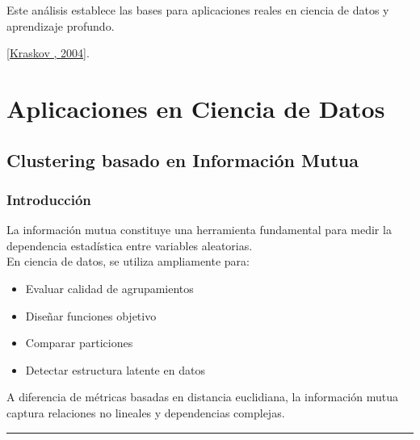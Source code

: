 \documentclass[letterpaper,10pt,english]{jupyterBook}
\begin{document}
\sphinxAtStartPar
Este análisis establece las bases para aplicaciones reales
en ciencia de datos y aprendizaje profundo.

\sphinxAtStartPar
{[}\hyperlink{cite.05_appendices/references:id7}{Kraskov , 2004}{]}.

\sphinxstepscope


\part{Aplicaciones en Ciencia de Datos}

\sphinxstepscope


\chapter{Clustering basado en Información Mutua}
\label{\detokenize{04_data_science_applications/clustering_mi:clustering-basado-en-informacion-mutua}}\label{\detokenize{04_data_science_applications/clustering_mi::doc}}

\section{Introducción}
\label{\detokenize{04_data_science_applications/clustering_mi:introduccion}}
\sphinxAtStartPar
La información mutua constituye una herramienta fundamental para medir la dependencia estadística entre variables aleatorias.\\
En ciencia de datos, se utiliza ampliamente para:
\begin{itemize}
\item {} 
\sphinxAtStartPar
Evaluar calidad de agrupamientos

\item {} 
\sphinxAtStartPar
Diseñar funciones objetivo

\item {} 
\sphinxAtStartPar
Comparar particiones

\item {} 
\sphinxAtStartPar
Detectar estructura latente en datos

\end{itemize}

\sphinxAtStartPar
A diferencia de métricas basadas en distancia euclidiana, la información mutua captura relaciones no lineales y dependencias complejas.


\bigskip\hrule\bigskip
\end{document}
